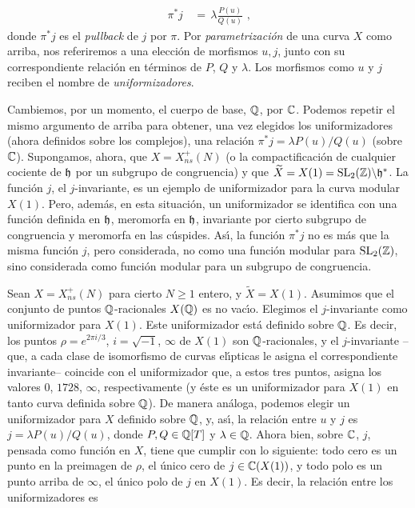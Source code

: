 \begin{align*}
 \pi^{*}j & \,=\,\lambda\frac{P(u)}{Q(u)}\text{ ,}
\end{align*}
donde $\pi^{*}j$ es el \textit{pullback} de $j$ por $\pi$. Por
\emph{parametrizaci\'{o}n} de una curva $X$ como arriba, nos referiremos a una
elecci\'{o}n de morfismos $u,j$, junto con su correspondiente relaci\'{o}n en
t\'{e}rminos de $P$, $Q$ y $\lambda$. Los morfismos como $u$ y $j$ reciben el
nombre de \emph{uniformizadores}.

Cambiemos, por un momento, el cuerpo de base, $\bb{Q}$, por $\bb{C}$. Podemos
repetir el mismo argumento de arriba para obtener, una vez elegidos los
uniformizadores (ahora definidos sobre los complejos), una relaci\'{o}n
$\pi^{*}j=\lambda P(u)/Q(u)$ (sobre $\bb{C}$).
Supongamos, ahora, que $X=X_{ns}^{+}(N)$ (o la compactificaci\'{o}n de
cualquier cociente de $\frak{h}$ por un subgrupo de congruencia) y que
$\widetilde{X}=X(1)=\SL{2}(\bb{Z})\backs\frak{h}^{*}$. La
funci\'{o}n $j$, el $j$-invariante, es un ejemplo de uniformizador para la
curva modular $X(1)$. Pero, adem\'{a}s, en esta situaci\'{o}n, un uniformizador
se identifica con una funci\'{o}n definida en $\frak{h}$, meromorfa en $\frak{h}$,
invariante por cierto subgrupo de congruencia y meromorfa en las c\'{u}spides.
As\'{\i}, la funci\'{o}n $\pi^{*}j$ no es m\'{a}s que la misma funci\'{o}n $j$,
pero considerada, no como una funci\'{o}n modular para $\SL{2}(\bb{Z})$, sino
considerada como funci\'{o}n modular para un subgrupo de congruencia.

Sean $X=X_{ns}^{+}(N)$ para cierto $N\geq 1$ entero, y
$\widetilde{X}=X(1)$. Asumimos que el conjunto de puntos $\bb{Q}$-racionales
$X(\bb{Q})$ es no vac\'{\i}o. Elegimos el $j$-invariante como uniformizador para
$X(1)$. Este uniformizador est\'{a} definido sobre $\bb{Q}$. Es decir, los puntos
$\rho =e^{2\pi i/3}$, $i=\sqrt{-1}$, $\infty$ de $X(1)$ son $\bb{Q}$-racionales, y
el $j$-invariante --que, a cada clase de isomorfismo de curvas el\'{\i}pticas le
asigna el correspondiente invariante-- coincide con el uniformizador que, a estos
tres puntos, asigna los valores $0$, $1728$, $\infty$, respectivamente
(y \'{e}ste es
un uniformizador para $X(1)$ en tanto curva definida sobre $\bb{Q}$). De manera
an\'{a}loga, podemos elegir un uniformizador para $X$ definido sobre $\bb{Q}$, y,
as\'{\i}, la relaci\'{o}n entre $u$ y $j$ es $j=\lambda P(u)/Q(u)$, donde
$P,Q\in\bb{Q}[T]$ y $\lambda\in\bb{Q}$. Ahora bien, sobre $\bb{C}$,
$j$, pensada como funci\'{o}n en $X$, tiene que cumplir con lo siguiente:
todo cero es un punto en la preimagen de $\rho$, el \'{u}nico cero de
$j\in\bb{C}(X(1))$, y todo polo es un punto arriba de $\infty$, el \'{u}nico polo
de $j$ en $X(1)$. Es decir, la relaci\'{o}n entre los uniformizadores es

